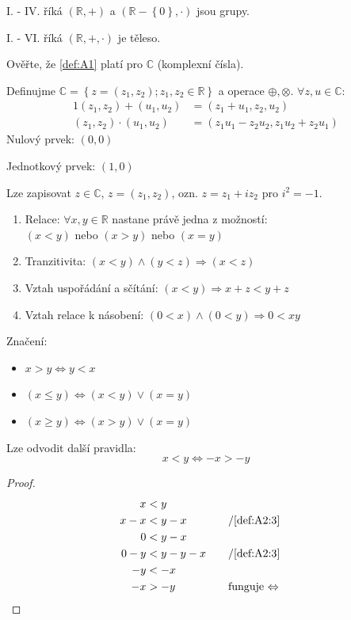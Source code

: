 I. - IV. říká $(\mathbb{R}, +)$ a $(\mathbb{R} - \left\{0\right\}, \cdot)$ jsou grupy.

I. - VI. říká $(\mathbb{R}, +, \cdot)$ je těleso.

Ověřte, že \autoref{def:A1} platí pro $\mathbb{C}$ (komplexní čísla).

\begin{example}
	Definujme $\mathbb{C} = \left\{z = (z_1, z_2); z_1, z_2 \in \mathbb{R}\right\}$ a
		operace $\oplus, \otimes$. $\forall z, u \in \mathbb{C}:$
	\begin{alignat}{1}
		(z_1, z_2) + (u_1, u_2) &= (z_1 + u_1, z_2, u_2) \\
		(z_1, z_2) \cdot (u_1, u_2) &= (z_1u_1 - z_2u_2, z_1u_2 + z_2u_1)
	\end{alignat}
	Nulový prvek: $(0, 0)$
	
	Jednotkový prvek: $(1, 0)$

	Lze zapisovat $z\in \mathbb{C}$, $z = (z_1, z_2)$, ozn. $z = z_1 + iz_2$ pro $i^2 = -1$.
\end{example}
\begin{definitionAi}[name=Uspořádání, label=def:A2]\noindent
	\begin{enumerate}[I]
		\item Relace: $\forall x, y \in \mathbb{R}$ nastane právě jedna z možností: \\
		$(x<y)$ nebo $(x>y)$ nebo $(x=y)$
		\item Tranzitivita: $(x<y) \land (y<z) \Rightarrow (x<z)$
		\item\label{def:A2:3} Vztah uspořádání a sčítání: $(x<y) \Rightarrow x+z < y+z$
		\item\label{def:A2:4} Vztah relace k násobení: $(0<x) \land (0<y) \Rightarrow 0 < xy$
	\end{enumerate}
\end{definitionAi}

Značení:
\begin{itemize}
	\item $x>y \Leftrightarrow y<x$
	\item $(x\leq y) \Leftrightarrow (x<y) \lor (x=y)$
	\item $(x\geq y) \Leftrightarrow (x>y) \lor (x=y)$
\end{itemize}

Lze odvodit další pravidla:
\begin{equation}\label{eq:relationsOfNegatives}
	x<y \Leftrightarrow -x > -y
\end{equation}
\begin{proof}
	\begin{alignat*}{2}
		x&<y \\
		x-x&<y-x &&\text{\quad /\autoref{def:A2:3}} \\
		0&<y-x \\
		0-y&<y-y-x &&\text{\quad /\autoref{def:A2:3}} \\
		-y&<-x \\
		-x&>-y &&\text{\quad funguje $\Leftrightarrow$}
	\end{alignat*}
\end{proof}

